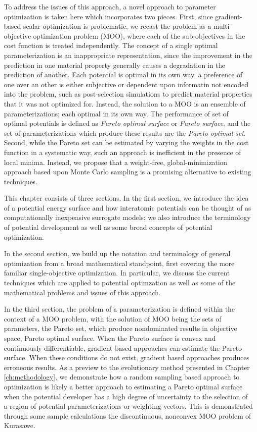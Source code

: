 To address the issues of this approach, a novel approach to parameter optimization is taken here which incorporates two pieces.  First, since gradient-based scalar optimization is problematic, we recast the problem as a multi-objective optimization problem (MOO), where each of the sub-objectives in the cost function is treated independently.  The concept of a single optimal parameterization is an inappropriate representation, since the improvement in the prediction in one material property generally causes a degradation in the prediction of another.  Each potential is optimal in its own way, a preference of one over an other is either subjective or dependent upon informatin not encoded into the problem, such as post-selection simulations to predict material properties that it was not optimized for.  Instead, the solution to a MOO is an ensemble of parameterizations; each optimal in its own way.  The performance of set of optimal potentials is defined as \emph{Pareto optimal surface} or \emph{Pareto surface}, and the set of parameterizations which produce these results are the \emph{Pareto optimal set}.  Second, while the Pareto set can be estimated by varying the weights in the cost function in a systematic way, such an approach is inefficient in the presence of local minima.  Instead, we propose that a weight-free, global-minimization approach based upon Monte Carlo sampling is a promising alternative to existing techniques.

This chapter consists of three sections.  In the first section, we introduce the idea of a potential energy surface and how interatomic potentials can be thought of as computationally inexpensive surrogate models; we also introduce the terminology of potential development as well as some broad concepts of potential optimization.

In the second section, we build up the notation and terminology of general optimization from a broad mathematical standpoint, first covering the more familiar single-objective optimization.  In particular, we discuss the current techniques which are applied to potential optimzation as well as some of the mathematical problems and issues of this approach.

In the third section, the problem of a parameterization is defined within the context of a MOO problem, with the solution of MOO being the sets of parameters, the Pareto set, which produce nondominated results in objective space, Pareto optimal surface.  When the Pareto surface is convex and continuously differentiable, gradient based approaches can estimate the Pareto surface.  When these conditions do not exist, gradient based approaches produces erroneous results.  As a preview to the evolutionary method presented in Chapter \ref{ch:methodology}, we demonstrate how a random sampling based approach to optimization is likely a better approach to estimating a Pareto optimal surface when the potential developer has a high degree of uncertainty to the selection of a region of potential parameterizations or weighting vectors.  This is demonstrated through some sample calculations the discontinuous, nonconvex MOO problem of Kurasawe\cite{kursawe1991_pareto}.

